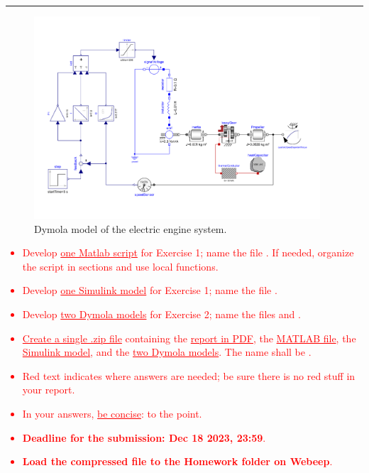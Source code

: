 \documentclass[11pt,a4paper,oneside]{article}
\newcommand{\tr}{\textcolor{red}}
\begin{document}
    
\medskip


\medskip \hrule \medskip
{}


\begin{figure}[h!]
    \centering
        \includegraphics[width = 0.95\textwidth]{gfx/ass1_scheme.pdf}
        \caption{Dymola model of the electric engine system.}\label{fig:ex2-1}
\end{figure}


\clearpage

\tr{
\begin{itemize}
\item Develop \underline{one Matlab script} for Exercise 1; name the file . If needed, organize the script in sections and use local functions. 
\item Develop \underline{one Simulink model} for Exercise 1; name the file . 
\item Develop \underline{two Dymola models} for Exercise 2; name the files  and  . 
\item \underline{Create a single .zip file} containing the \underline{report in PDF}, the \underline{MATLAB file}, the \underline{Simulink model}, and the \underline{two Dymola models}. The name shall be .
\item Red text indicates where answers are needed; be sure there is no red stuff in your report.
\item In your answers, \underline{be concise}: to the point.
\item \textbf{Deadline for the submission: Dec 18 2023, 23:59}.
\item \textbf{Load the compressed file to the Homework folder on Webeep}.
\end{itemize}
}
\end{document}
